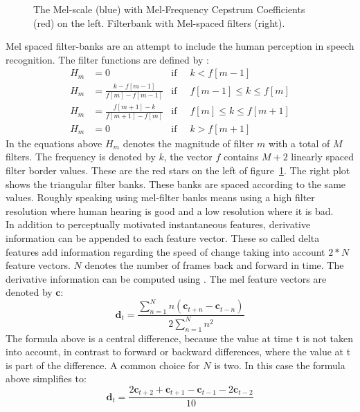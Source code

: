 \begin{figure}
\centering


\caption{The Mel-scale (blue) with Mel-Frequency Cepstrum Coefficients (red)  on the left. Filterbank with Mel-spaced filters (right).}
\label{fig:mel}
\end{figure}
Mel spaced filter-banks are an attempt to include the human perception in speech recognition. The filter functions are defined by \cite[page 317]{Huang2001}:
\begin{align}
H_m &= 0 									   &\text{if}\;\; & k < f[m-1] \\
H_m &= \frac{k      - f[m-1] }{f[m] - f[m-1]}  &\text{if}\;\; & f[m-1] \leq k \leq f[m] \\
H_m &= \frac{f[m+1] - k      }{f[m + 1] - f[m]}&\text{if}\;\; & f[m] \leq k \leq f[m+1] \\
H_m &= 0									   &\text{if}\;\; & k > f[m+1]
\end{align}
In the equations above $H_m$ denotes the magnitude of filter $m$ with a total of $M$ filters. The frequency is denoted by $k$, the vector $f$ contains $M+2$ linearly spaced filter border values. These are the red stars on the left of  figure~\ref{fig:mel}. The right plot shows the triangular filter banks. These banks are spaced according to the same values. Roughly speaking using mel-filter banks means using a high filter resolution where human hearing is good and a low resolution where it is bad. \\
In addition to perceptually motivated instantaneous features, derivative information can be appended to each feature vector. These so called delta features add information
regarding the speed of change taking into account $2*N$ feature vectors. $N$ denotes the number of frames back and forward in time. The derivative information can be computed using \cite{Woodland2006}. The mel feature vectors are denoted by $\mathbf{c}$:
\begin{equation}
\mathbf{d}_t = \frac{\sum\limits_{n=1}^{N} n (\mathbf{c}_{t+n}- \mathbf{c}_{t-n})}{2 \sum\limits_{n=1}^{N} n^2}
\end{equation}
The formula above is a central difference, because the value at time t is not taken into account, in contrast to forward or backward differences, where the value at t is part of the difference. A common choice for $N$ is two. In this case the formula above simplifies to:
\begin{equation}
\mathbf{d}_t = \frac{2\mathbf{c}_{t+2} + \mathbf{c}_{t+1} - \mathbf{c}_{t-1} - 2\mathbf{c}_{t-2}}{10}
\end{equation}

